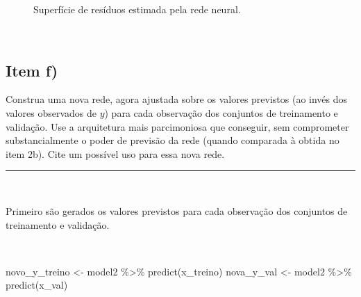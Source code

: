 \documentclass[
  a4paperpaper,
]{article}
\newenvironment{Shaded}{\begin{snugshade}}{\end{snugshade}}
\newcommand{\FunctionTok}[1]{\textcolor[rgb]{0.28,0.35,0.67}{#1}}
\newcommand{\NormalTok}[1]{\textcolor[rgb]{0.00,0.23,0.31}{#1}}
\newcommand{\OtherTok}[1]{\textcolor[rgb]{0.00,0.23,0.31}{#1}}
\newcommand{\SpecialCharTok}[1]{\textcolor[rgb]{0.37,0.37,0.37}{#1}}
\begin{document}
\begin{figure}[H]


\caption{\label{fig-q2eb}Superfície de resíduos estimada pela rede
neural.}

\end{figure}%

~

\subsection{Item f)}\label{item-f}

Construa uma nova rede, agora ajustada sobre os valores previstos (ao
invés dos valores observados de \(y\)) para cada observação dos
conjuntos de treinamento e validação. Use a arquitetura mais
parcimoniosa que conseguir, sem comprometer substancialmente o poder de
previsão da rede (quando comparada à obtida no item 2b). Cite um
possível uso para essa nova rede.

\begin{center}\rule{0.5\linewidth}{0.5pt}\end{center}

~

Primeiro são gerados os valores previstos para cada observação dos
conjuntos de treinamento e validação.

~

\begin{Shaded}
\begin{Highlighting}[]
\NormalTok{novo\_y\_treino }\OtherTok{\textless{}{-}}\NormalTok{ model2 }\SpecialCharTok{\%\textgreater{}\%} \FunctionTok{predict}\NormalTok{(x\_treino)}
\NormalTok{nova\_y\_val }\OtherTok{\textless{}{-}}\NormalTok{ model2 }\SpecialCharTok{\%\textgreater{}\%} \FunctionTok{predict}\NormalTok{(x\_val)}
\end{Highlighting}
\end{Shaded}
\end{document}
